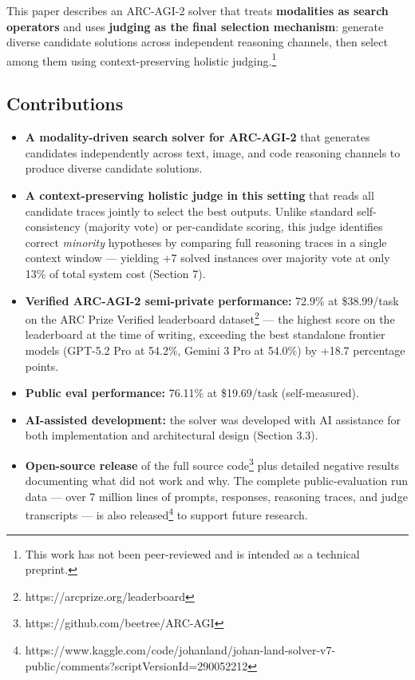 \documentclass[11pt]{article}
\providecommand{\tightlist}{%
  \setlength{\itemsep}{0pt}\setlength{\parskip}{0pt}}
\begin{document}
This paper describes an ARC-AGI-2 solver that treats \textbf{modalities
as search operators} and uses \textbf{judging as the final selection
mechanism}: generate diverse candidate solutions across independent
reasoning channels, then select among them using context-preserving
holistic judging.\footnote{This work has not been peer-reviewed and is
  intended as a technical preprint.}

\hypertarget{contributions}{%
\subsection{Contributions}\label{contributions}}

\begin{itemize}
\tightlist
\item
  \textbf{A modality-driven search solver for ARC-AGI-2} that generates
  candidates independently across text, image, and code reasoning
  channels to produce diverse candidate solutions.
\item
  \textbf{A context-preserving holistic judge in this setting} that
  reads all candidate traces jointly to select the best outputs. Unlike
  standard self-consistency (majority vote) or per-candidate scoring,
  this judge identifies correct \emph{minority} hypotheses by comparing
  full reasoning traces in a single context window --- yielding +7
  solved instances over majority vote at only 13\% of total system cost
  (Section 7).
\item
  \textbf{Verified ARC-AGI-2 semi-private performance:} 72.9\% at
  \$38.99/task on the ARC Prize Verified leaderboard dataset\footnote{https://arcprize.org/leaderboard}
  --- the highest score on the leaderboard at the time of writing,
  exceeding the best standalone frontier models (GPT-5.2 Pro at 54.2\%,
  Gemini 3 Pro at 54.0\%) by +18.7 percentage points.
\item
  \textbf{Public eval performance:} 76.11\% at \$19.69/task
  (self-measured).
\item
  \textbf{AI-assisted development:} the solver was developed with AI
  assistance for both implementation and architectural design (Section
  3.3).
\item
  \textbf{Open-source release} of the full source code\footnote{https://github.com/beetree/ARC-AGI}
  plus detailed negative results documenting what did not work and why.
  The complete public-evaluation run data --- over 7 million lines of
  prompts, responses, reasoning traces, and judge transcripts --- is
  also released\footnote{https://www.kaggle.com/code/johanland/johan-land-solver-v7-public/comments?scriptVersionId=290052212}
  to support future research.
\end{itemize}
\end{document}
